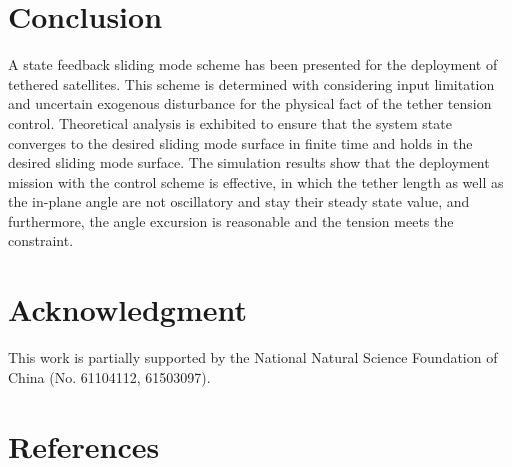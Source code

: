 \documentclass[3p]{elsarticle}
\theoremstyle{plain}
\begin{document}
\section{Conclusion}\label{sec:Conclusion}
A state feedback sliding mode scheme has been presented for the deployment of tethered satellites. This scheme is determined with considering input limitation and uncertain exogenous disturbance for the physical fact of the tether tension control. Theoretical analysis is exhibited to ensure that the system state converges to the desired sliding mode surface in finite time and holds in the desired sliding mode surface. The simulation results show that the deployment mission with the control scheme is effective, in which the tether length as well as the in-plane angle are not oscillatory and stay their steady state value, and furthermore, the angle excursion is reasonable and the tension meets the constraint.
\section{Acknowledgment}
This work is partially supported by the National Natural Science Foundation of China (No. 61104112, 61503097).
\section{References}


\end{document}

